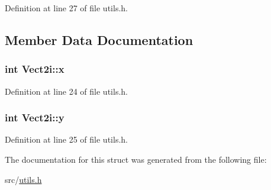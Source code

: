 Definition at line 27 of file utils.\-h.



\subsection{Member Data Documentation}
\hypertarget{struct_vect2i_ae76ced0cba575b16f9de72e78828122b}{
\subsubsection[{x}]{\setlength{\rightskip}{0pt plus 5cm}int Vect2i\-::x}}\label{struct_vect2i_ae76ced0cba575b16f9de72e78828122b}


Definition at line 24 of file utils.\-h.

\hypertarget{struct_vect2i_a32d99812cd2cccca2b9751259783b699}{
\subsubsection[{y}]{\setlength{\rightskip}{0pt plus 5cm}int Vect2i\-::y}}\label{struct_vect2i_a32d99812cd2cccca2b9751259783b699}


Definition at line 25 of file utils.\-h.



The documentation for this struct was generated from the following file\-:\begin{DoxyCompactItemize}
\item 
src/\hyperlink{utils_8h}{utils.\-h}\end{DoxyCompactItemize}
